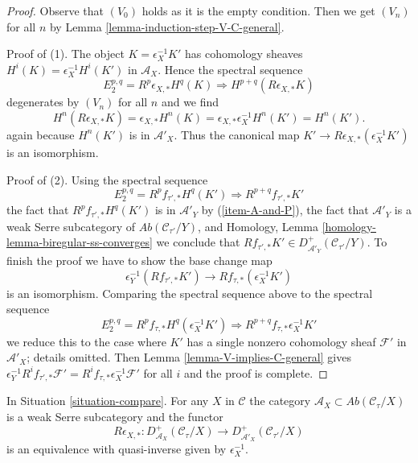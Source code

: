 \begin{proof}
Observe that $(V_0)$ holds as it is the empty condition.
Then we get $(V_n)$ for all $n$ by
Lemma \ref{lemma-induction-step-V-C-general}.

\medskip\noindent
Proof of (1). The object $K = \epsilon_X^{-1}K'$ has cohomology
sheaves $H^i(K) = \epsilon_X^{-1}H^i(K')$ in $\mathcal{A}_X$.
Hence the spectral sequence
$$
E_2^{p, q} = R^p\epsilon_{X, *} H^q(K) \Rightarrow
H^{p + q}(R\epsilon_{X, *}K)
$$
degenerates by $(V_n)$ for all $n$ and we find
$$
H^n(R\epsilon_{X, *}K) = \epsilon_{X, *}H^n(K) =
\epsilon_{X, *}\epsilon_X^{-1}H^n(K') = H^n(K').
$$
again because $H^n(K')$ is in $\mathcal{A}'_X$.
Thus the canonical map $K' \to R\epsilon_{X, *}(\epsilon_X^{-1}K')$
is an isomorphism.

\medskip\noindent
Proof of (2). Using the spectral sequence
$$
E_2^{p, q} = R^pf_{\tau', *}H^q(K') \Rightarrow R^{p + q}f_{\tau', *}K'
$$
the fact that $R^pf_{\tau', *}H^q(K')$ is in
$\mathcal{A}'_Y$ by (\ref{item-A-and-P}),
the fact that $\mathcal{A}'_Y$ is a weak Serre subcategory of
$\textit{Ab}(\mathcal{C}_{\tau'}/Y)$,
and Homology, Lemma \ref{homology-lemma-biregular-ss-converges}
we conclude that
$Rf_{\tau', *}K' \in D^+_{\mathcal{A}'_Y}(\mathcal{C}_{\tau'}/Y)$.
To finish the proof we have to show the base change map
$$
\epsilon_Y^{-1}(Rf_{\tau', *}K')
\longrightarrow
Rf_{\tau, *}(\epsilon_X^{-1}K')
$$
is an isomorphism. Comparing the spectral sequence above to the
spectral sequence
$$
E_2^{p, q} = R^pf_{\tau, *}H^q(\epsilon_X^{-1}K')
\Rightarrow R^{p + q}f_{\tau, *}\epsilon_X^{-1}K'
$$
we reduce this to the case where $K'$ has a single nonzero
cohomology sheaf $\mathcal{F}'$ in $\mathcal{A}'_X$; details omitted.
Then Lemma \ref{lemma-V-implies-C-general} gives
$\epsilon_Y^{-1}R^if_{\tau', *}\mathcal{F}' =
R^if_{\tau, *}\epsilon_X^{-1}\mathcal{F}'$ for all $i$
and the proof is complete.
\end{proof}

\begin{lemma}
\label{lemma-cohomological-descent-general}
In Situation \ref{situation-compare}. For any $X$ in
$\mathcal{C}$ the category
$\mathcal{A}_X \subset \textit{Ab}(\mathcal{C}_\tau/X)$
is a weak Serre subcategory and the functor
$$
R\epsilon_{X, *} :
D^+_{\mathcal{A}_X}(\mathcal{C}_\tau/X)
\longrightarrow
D^+_{\mathcal{A}'_X}(\mathcal{C}_{\tau'}/X)
$$
is an equivalence with quasi-inverse given by $\epsilon_X^{-1}$.
\end{lemma}

